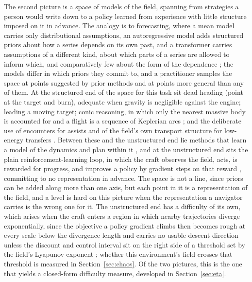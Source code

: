 \documentclass[11pt]{article}
\begin{document}
The second picture is a space of models of the field, spanning from
strategies a person would write down to a policy learned from experience
with little structure imposed on it in advance. The analogy is to forecasting, where a mean
model carries only distributional assumptions, an autoregressive model adds
structured priors about how a series depends on its own past, and a
transformer carries assumptions of a different kind, about which parts of
a series are allowed to inform which, and comparatively few about the form
of the dependence \cite{box2015,vaswani2017}; the models differ in which priors they commit
to, and a practitioner samples the space at points suggested by prior
methods and at points more general than any of them. At the structured end
of the space for this task sit dead heading (point at the target and burn),
adequate when gravity is negligible against the engine; leading a moving
target; conic reasoning, in which only the nearest massive body is accounted
for and a flight is a sequence of Keplerian arcs \cite{bate1971}; and the
deliberate use of encounters for assists \cite{flandro1966} and of the
field's own transport structure for low-energy transfers
\cite{belbruno1993,koon2000}. Between these and the unstructured end lie
methods that learn a model of the dynamics and plan within it
\cite{moerland2023}, and at the unstructured end sits the plain
reinforcement-learning loop, in which the craft observes the field, acts, is
rewarded for progress, and improves a policy by gradient steps on that
reward \cite{sutton2018,schulman2017}, committing to no representation in
advance. The space is not a line, since priors can be added along more than
one axis, but each point in it is a representation of the field, and a level
is hard on this picture when the representation a navigator carries is the
wrong one for it. The unstructured end has a difficulty of its own, which arises when the
craft enters a region in which nearby trajectories diverge exponentially,
since the objective a policy gradient climbs then becomes rough at every
scale below the divergence length and carries no usable descent direction unless the
discount and control interval sit on the right side of a threshold set by
the field's Lyapunov exponent \cite{wang2023,metz2021,parmas2018}; whether
this environment's field crosses that threshold is measured in
Section~\ref{sec:chaos}. Of the two pictures, this is the one that yields a
closed-form difficulty measure, developed in Section~\ref{sec:eta}.
\end{document}
